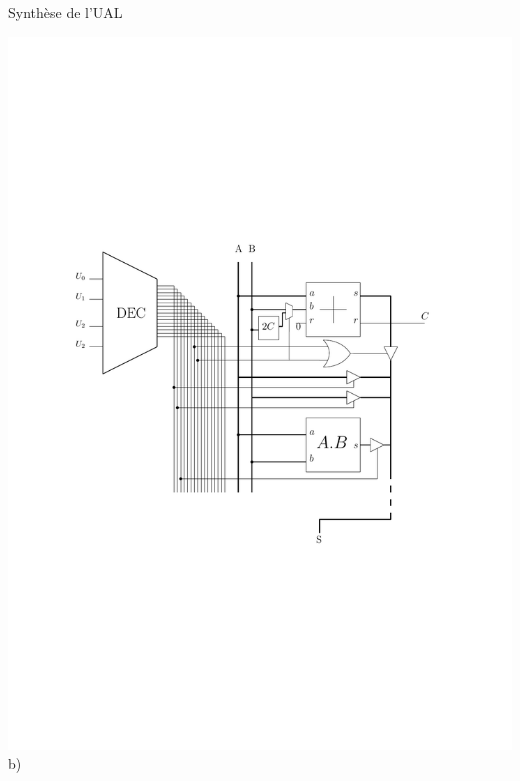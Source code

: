 \documentclass{beamer}
\begin{document}
\begin{frame}
\begin{block}{Synthèse de l'UAL}
\begin{minipage}[c]{.58\linewidth}
\includegraphics[width=\columnwidth]{Figs/ual_inner.pdf}\\\centering b)
   \end{minipage}

\end{block}
\end{frame}
\end{document}
